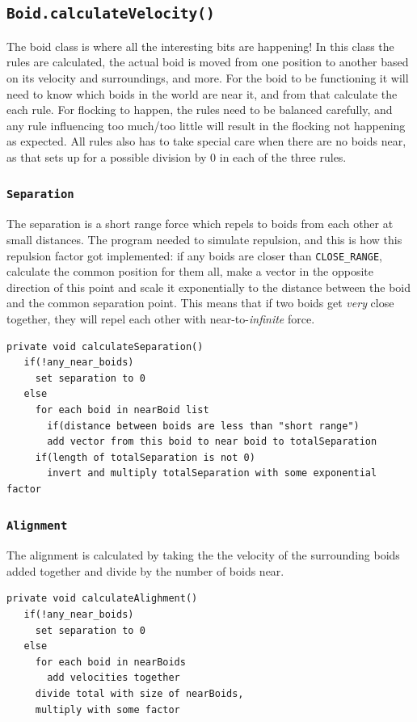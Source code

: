 \documentclass[a4paper,twoside, 10pt]{report}
\newcommand{\code}[1]{\texttt{#1}}
\begin{document}
\subsection{\code{Boid.calculateVelocity()}}
\label{subsec:flockingImplement}
The boid class is where all the interesting bits are happening! In this class the rules are calculated, the actual boid is moved from one position to another based on its velocity and surroundings, and more. For the boid to be functioning it will need to know which boids in the world are near it, and from that calculate the each rule. For flocking to happen, the rules need to be balanced carefully, and any rule influencing too much/too little will result in the flocking not happening as expected. All rules also has to take special care when there are no boids near, as that sets up for a possible division by 0 in each of the three rules.

\subsubsection{\code{Separation}}
\label{subsubsec:separationImplement}
The separation is a short range force which repels to boids from each other at small distances. The program needed to simulate repulsion, and this is how this repulsion factor got implemented: if any boids are closer than \code{CLOSE{\_}RANGE}, calculate the common position for them all, make a vector in the opposite direction of this point and scale it exponentially to the distance between the boid and the common separation point. This means that if two boids get \textit{very} close together, they will repel each other with near-to-\textit{infinite} force.

\begin{verbatim}
private void calculateSeparation()
   if(!any_near_boids)
     set separation to 0
   else
     for each boid in nearBoid list
       if(distance between boids are less than "short range")
       add vector from this boid to near boid to totalSeparation
     if(length of totalSeparation is not 0)
       invert and multiply totalSeparation with some exponential factor
\end{verbatim}

\subsubsection{\code{Alignment}}
\label{subsubsec:alignmentImplement}
The alignment is calculated by taking the the velocity of the surrounding boids added together and divide by the number of boids near.
\begin{verbatim}
private void calculateAlighment()
   if(!any_near_boids)
     set separation to 0
   else
     for each boid in nearBoids
       add velocities together
     divide total with size of nearBoids, 
     multiply with some factor
\end{verbatim}
\end{document}

